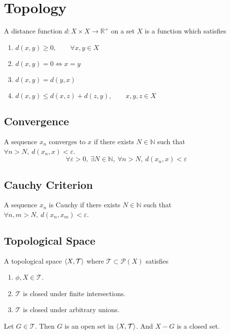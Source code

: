 \chapter{Topology}
\begin{definition}
	A distance function $d : X \times X \to \mathbb{R}^+$ on a set $X$ is a function which satisfies
	\begin{enumerate}
		\item $d(x,y) \ge 0,\qquad \forall x,y \in X$
		\item $d(x,y) = 0 \iff x=y$
		\item $d(x,y) = d(y,x)$
		\item $d(x,y) \le d(x,z) + d(z,y), \qquad x,y,z \in X$
	\end{enumerate}
\end{definition}

\section{Convergence}
\begin{definition}[metric]
	A sequence $x_n$ converges to $x$ if there exists $N \in \mathbb{N}$ such that $\forall n > N,\ d(x_n,x) < \varepsilon$.
\begin{equation}
	\forall \varepsilon > 0,\ \exists N \in \mathbb{N},\ \forall n > N,\ d(x_n,x) < \varepsilon
\end{equation}
\end{definition}

\section{Cauchy Criterion}
\begin{definition}[metric]
	A sequence $x_n$ is Cauchy if there exists $N \in \mathbb{N}$ such that $\forall n,m > N,\ d(x_n,x_m) < \varepsilon$.
\end{definition}

\section{Topological Space}
\begin{definition}
	A topological space $\left\langle X,\mathcal{T} \right\rangle$ where $\mathcal{T} \subset \mathcal{P}(X)$ satisfies
	\begin{enumerate}
		\item $\phi,X \in \mathcal{T}$.
		\item $\mathcal{T}$ is closed under finite intersections.
		\item $\mathcal{T}$ is closed under arbitrary unions.
	\end{enumerate}
	Let $G \in \mathcal{T}$.
	Then $G$ is an open set in $\left\langle X,\mathcal{T} \right\rangle$.
	And $X-G$ is a closed set.
\end{definition}

